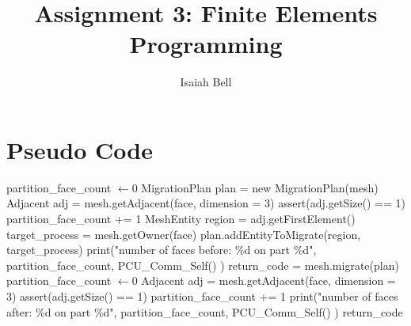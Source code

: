 \documentclass{article}
\begin{document}
\title{Assignment 3: Finite Elements Programming}
\author{Isaiah Bell} 
\maketitle
  
\section{Pseudo Code}

\begin{algorithm}
\begin{algorithmic}

    \State partition\_face\_count $\gets 0$ 
    \State MigrationPlan plan = new MigrationPlan(mesh)
            \State Adjacent adj = mesh.getAdjacent(face, dimension = 3)
            \State assert(adj.getSize() == 1)
            \State partition\_face\_count += 1
             
                \State MeshEntity region = adj.getFirstElement()
                 
                    \State target\_process = mesh.getOwner(face)
                    \State plan.addEntityToMigrate(region, target\_process) 
                \EndIf
            \EndIf
        \EndIf
    \EndFor
    \State print("number of faces before: \%d on part \%d", partition\_face\_count, PCU\_Comm\_Self() )
    \State return\_code = mesh.migrate(plan)
    \State partition\_face\_count $\gets 0$ 
            \State Adjacent adj = mesh.getAdjacent(face, dimension = 3)
            \State assert(adj.getSize() == 1)
            \State partition\_face\_count += 1
        \EndIf
    \EndFor
    \State print("number of faces after: \%d on part \%d", partition\_face\_count, PCU\_Comm\_Self() )
    \State \Return return\_code
\EndProcedure

\end{algorithmic}
\end{algorithm}
\end{document}
